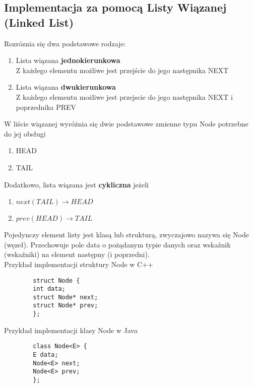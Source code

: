 \documentclass[main.tex]{subfiles}
\begin{document}
    \subsection{Implementacja za pomocą Listy Wiązanej (Linked List)}
    Rozróznia się dwa podstawowe rodzaje:
    \begin{enumerate}
        \item Lista wiązana \textbf{jednokierunkowa} \\
        Z każdego elementu możliwe jest przejście do jego następnika NEXT
        \item Lista wiązana \textbf{dwukierunkowa} \\
        Z każdego elementu możliwe jest przejscie do jego następnika NEXT i poprzednika PREV
    \end{enumerate}

    W liście wiązanej wyróżnia się dwie podstawowe zmienne typu Node potrzebne do jej obsługi

    \begin{enumerate}
        \item HEAD
        \item TAIL
    \end{enumerate}

    Dodatkowo, lista wiązana jest \textbf{cykliczna} jeżeli

    \begin{enumerate}
        \item{$next(TAIL) \rightarrow HEAD$}
        \item{$prev(HEAD) \rightarrow TAIL$}
    \end{enumerate}

    Pojedynczy element listy jest klasą lub strukturą, zwyczajowo nazywa się Node (węzeł). Przechowuje pole data o pożądanym typie danych oraz wskaźnik (wskaźniki) na element następny (i poprzedni).
    \\
    Przykład implementacji struktury Node w C++

    \begin{verbatim}
        struct Node {
        int data;
        struct Node* next;
        struct Node* prev;
        };
    \end{verbatim}
    \newpage
    Przykład implementacji klasy Node w Java

    \begin{verbatim}
        class Node<E> {
        E data;
        Node<E> next;
        Node<E> prev;
        };
    \end{verbatim}
\end{document}
